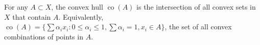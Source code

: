 For any $A \subset X$, the convex hull $\operatorname{co}(A)$ is the intersection of all convex sets in $X$ that contain $A$. Equivalently, $\operatorname{co}(A) = \{\sum \alpha_i x_i : 0 \leqslant \alpha_i \leqslant 1, \sum \alpha_i = 1, x_i \in A\}$, the set of all convex combinations of points in $A$.